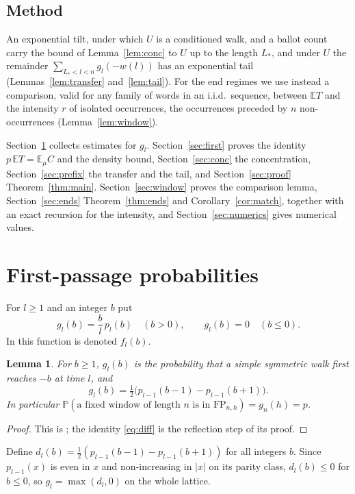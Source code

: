 \documentclass[11pt]{amsart}
\newtheorem{lemma}[theorem]{Lemma}
\theoremstyle{remark}
\numberwithin{equation}{section}
\newcommand{\PP}{\mathbb{P}}
\newcommand{\EE}{\mathbb{E}}
\newcommand{\FP}{\mathrm{FP}}
\begin{document}
\subsection*{Method}
An exponential tilt, under which $U$ is a conditioned walk, and a ballot count carry the bound of Lemma~\ref{lem:conc} to $U$ up to the length $L_*$, and under $U$ the remainder $\sum_{L_*<l<n}g_l(-w(l))$ has an exponential tail (Lemmas~\ref{lem:transfer} and~\ref{lem:tail}). For the end regimes we use instead a comparison, valid for any family of words in an i.i.d.\ sequence, between $\EE T$ and the intensity $r$ of isolated occurrences, the occurrences preceded by $n$ non-occurrences (Lemma~\ref{lem:window}).

Section~\ref{sec:prelim} collects estimates for $g_l$. Section~\ref{sec:first} proves the identity $p\,\EE T=\EE_\mu C$ and the density bound, Section~\ref{sec:conc} the concentration, Section~\ref{sec:prefix} the transfer and the tail, and Section~\ref{sec:proof} Theorem~\ref{thm:main}. Section~\ref{sec:window} proves the comparison lemma, Section~\ref{sec:ends} Theorem~\ref{thm:ends} and Corollary~\ref{cor:match}, together with an exact recursion for the intensity, and Section~\ref{sec:numerics} gives numerical values.

\section{First-passage probabilities}\label{sec:prelim}

For $l\ge1$ and an integer $b$ put
\[
g_l(b)=\frac bl\,p_l(b)\quad(b>0),\qquad g_l(b)=0\quad(b\le0).
\]
In \cite[Lemma~2.1]{Sh26} this function is denoted $f_l(b)$.

\begin{lemma}\label{lem:ballot}
For $b\ge1$, $g_l(b)$ is the probability that a simple symmetric walk first reaches $-b$ at time $l$, and
\begin{equation}\label{eq:diff}
g_l(b)=\tfrac12\bigl(p_{l-1}(b-1)-p_{l-1}(b+1)\bigr).
\end{equation}
In particular $\PP(\text{a fixed window of length $n$ is in }\FP_{n,h})=g_n(h)=p$.
\end{lemma}

\begin{proof}
This is \cite[Lemma~2.1]{Sh26}; the identity \eqref{eq:diff} is the reflection step of its proof.
\end{proof}

Define $d_l(b)=\frac12(p_{l-1}(b-1)-p_{l-1}(b+1))$ for all integers $b$. Since $p_{l-1}(x)$ is even in $x$ and non-increasing in $|x|$ on its parity class, $d_l(b)\le0$ for $b\le0$, so $g_l=\max(d_l,0)$ on the whole lattice.
\end{document}
